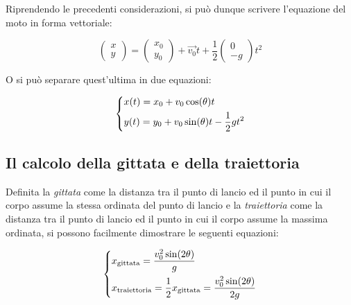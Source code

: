 \documentclass[oneside]{book}
\begin{document}
Riprendendo le precedenti considerazioni, si può dunque scrivere
l'equazione del moto in forma vettoriale:

\begin{equation}
    \begin{pmatrix}
        x \\
        y
    \end{pmatrix} = \begin{pmatrix}
        x_0 \\
        y_0
    \end{pmatrix} + \vec{v_0} t + \frac12 \begin{pmatrix}
        0 \\
        -g
    \end{pmatrix} t^2
\end{equation}

O si può separare quest'ultima in due equazioni:

\begin{equation}
    \begin{dcases}
        x(t)=x_0+v_0\cos(\theta)t \\
        y(t)=y_0+v_0\sin(\theta)t-\frac12gt^2
    \end{dcases}
\end{equation}

\subsection{Il calcolo della gittata e della traiettoria}

Definita la \textit{gittata} come la distanza tra il punto di lancio ed
il punto in cui il corpo assume la stessa ordinata del punto di lancio e
la \textit{traiettoria} come la distanza tra il punto di lancio ed il
punto in cui il corpo assume la massima ordinata, si possono facilmente
dimostrare le seguenti equazioni:

\begin{equation}
    \displaystyle
    \begin{dcases}
        x_{\text{gittata}} = \frac{v_0^2 \sin(2\theta)}{g} \\
        x_{\text{traiettoria}} = \frac12 x_{\text{gittata}} = \frac{v_0^2 \sin(2\theta)}{2g}
    \end{dcases}
\end{equation}
\end{document}
